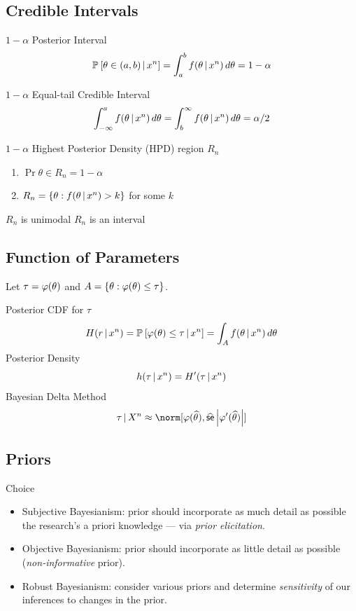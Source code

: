 \documentclass[landscape]{article}
\begin{document}
\begin{multicols*}{2}
\subsection{Credible Intervals}
$1-\alpha$ Posterior Interval
$$\mathbb{P}_{}\left[\theta\in (a,b)\,|\, x^n\right] 
= \int_{a}^{b} f(\theta\,|\, x^n)\,d\theta 
= 1-\alpha$$

$1-\alpha$ Equal-tail Credible Interval
$$\int_{-\infty}^{a} f(\theta\,|\, x^n)\,d\theta
= \int_{b}^{\infty} f(\theta\,|\, x^n)\,d\theta = \alpha/2$$

$1-\alpha$ Highest Posterior Density (HPD) region $R_n$
\begin{enumerate}
  \item $\Pr{\theta\in R_n} = 1-\alpha$
  \item $R_n = \left\{ \theta: f(\theta\,|\, x^n) > k \right\}$ for some $k$
\end{enumerate}
$R_n$ is unimodal \imp $R_n$ is an interval

\subsection{Function of Parameters}
Let $\tau = \varphi(\theta)$ and $A =
\left\{ \theta:\varphi(\theta) \le \tau \right\}$. 

Posterior CDF for $\tau$
$$H(r\,|\, x^n) 
= \mathbb{P}_{}\left[\varphi(\theta) \le \tau\,|\, x^n\right] 
= \int_A f(\theta \,|\, x^n)\,d\theta$$
Posterior Density
$$h(\tau\,|\, x^n) = H^\prime(\tau\,|\, x^n)$$
Bayesian Delta Method
$$\tau\giv X^n \approx \norm[\transform(\that),
\sehat\left|\transform^\prime(\that)\right|]$$

\subsection{Priors}

Choice
\begin{itemize}
  \item Subjective Bayesianism: prior should incorporate as much detail as
    possible the research's a priori knowledge --- via \emph{prior
    elicitation}.
  \item Objective Bayesianism: prior should incorporate as little detail as
    possible (\emph{non-informative} prior).
  \item Robust Bayesianism: consider various priors and determine
    \emph{sensitivity} of our inferences to changes in the prior.
\end{itemize}


\end{multicols*}
\end{document}
